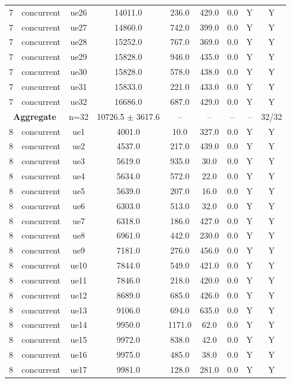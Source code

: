 \begin{table}[ht]
\begin{tabular}{|c|c|c|c|c|c|c|c|c|}
7 & concurrent & ue26 & 14011.0 & 236.0 & 429.0 & 0.0 & Y & Y \\
7 & concurrent & ue27 & 14860.0 & 742.0 & 399.0 & 0.0 & Y & Y \\
7 & concurrent & ue28 & 15252.0 & 767.0 & 369.0 & 0.0 & Y & Y \\
7 & concurrent & ue29 & 15828.0 & 946.0 & 435.0 & 0.0 & Y & Y \\
7 & concurrent & ue30 & 15828.0 & 578.0 & 438.0 & 0.0 & Y & Y \\
7 & concurrent & ue31 & 15833.0 & 221.0 & 433.0 & 0.0 & Y & Y \\
7 & concurrent & ue32 & 16686.0 & 687.0 & 429.0 & 0.0 & Y & Y \\
\multicolumn{2}{|c|}{\textbf{Aggregate}} & n=32 & 10726.5 $\pm$ 3617.6 & -- & -- & -- & -- & 32/32 \\
\hline
8 & concurrent & ue1 & 4001.0 & 10.0 & 327.0 & 0.0 & Y & Y \\
8 & concurrent & ue2 & 4537.0 & 217.0 & 439.0 & 0.0 & Y & Y \\
8 & concurrent & ue3 & 5619.0 & 935.0 & 30.0 & 0.0 & Y & Y \\
8 & concurrent & ue4 & 5634.0 & 572.0 & 22.0 & 0.0 & Y & Y \\
8 & concurrent & ue5 & 5639.0 & 207.0 & 16.0 & 0.0 & Y & Y \\
8 & concurrent & ue6 & 6303.0 & 513.0 & 32.0 & 0.0 & Y & Y \\
8 & concurrent & ue7 & 6318.0 & 186.0 & 427.0 & 0.0 & Y & Y \\
8 & concurrent & ue8 & 6961.0 & 442.0 & 230.0 & 0.0 & Y & Y \\
8 & concurrent & ue9 & 7181.0 & 276.0 & 456.0 & 0.0 & Y & Y \\
8 & concurrent & ue10 & 7844.0 & 549.0 & 421.0 & 0.0 & Y & Y \\
8 & concurrent & ue11 & 7846.0 & 218.0 & 420.0 & 0.0 & Y & Y \\
8 & concurrent & ue12 & 8689.0 & 685.0 & 426.0 & 0.0 & Y & Y \\
8 & concurrent & ue13 & 9106.0 & 694.0 & 635.0 & 0.0 & Y & Y \\
8 & concurrent & ue14 & 9950.0 & 1171.0 & 62.0 & 0.0 & Y & Y \\
8 & concurrent & ue15 & 9972.0 & 838.0 & 42.0 & 0.0 & Y & Y \\
8 & concurrent & ue16 & 9975.0 & 485.0 & 38.0 & 0.0 & Y & Y \\
8 & concurrent & ue17 & 9981.0 & 128.0 & 281.0 & 0.0 & Y & Y \\

\end{tabular}
\end{table}
